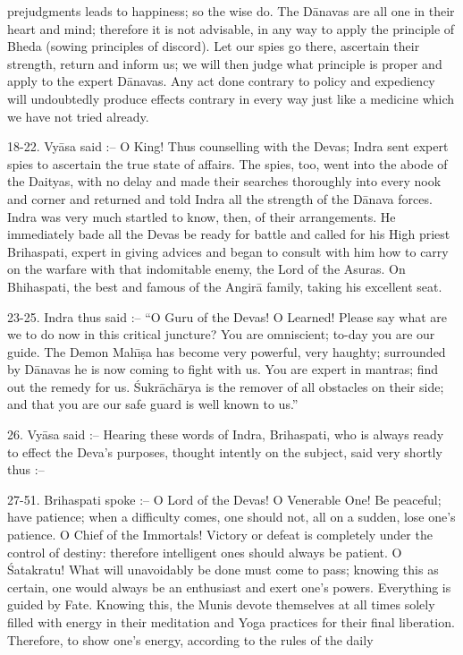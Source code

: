 prejudgments leads to happiness; so the wise do. The D\=anavas are all one in their heart and mind; therefore it is not advisable, in any way to apply the principle of Bheda (sowing principles of discord). Let our spies go there, ascertain their strength, return and inform us; we will then judge what principle is proper and apply to the expert D\=anavas. Any act done contrary to policy and expediency will undoubtedly produce effects contrary in every way just like a medicine which we have not tried already.

18-22. Vy\=asa said :-- O King! Thus counselling with the Devas; Indra sent expert spies to ascertain the true state of affairs. The spies, too, went into the abode of the Daityas, with no delay and made their searches thoroughly into every nook and corner and returned and told Indra all the strength of the D\=anava forces. Indra was very much startled to know, then, of their arrangements. He immediately bade all the Devas be ready for battle and called for his High priest Brihaspati, expert in giving advices and began to consult with him how to carry on the warfare with that indomitable enemy, the Lord of the Asuras. On Bhihaspati, the best and famous of the Angir\=a family, taking his excellent seat.

23-25. Indra thus said :-- ``O Guru of the Devas! O Learned! Please say what are we to do now in this critical juncture? You are omniscient; to-day you are our guide. The Demon Mah\={\i}\d{s}a has become very powerful, very haughty; surrounded by D\=anavas he is now coming to fight with us. You are expert in mantras; find out the remedy for us. \'Sukr\=ach\=arya is the remover of all obstacles on their side; and that you are our safe guard is well known to us.''

26. Vy\=asa said :-- Hearing these words of Indra, Brihaspati, who is always ready to effect the Deva's purposes, thought intently on the subject, said very shortly thus :--

27-51. Brihaspati spoke :-- O Lord of the Devas! O Venerable One! Be peaceful; have patience; when a difficulty comes, one should not, all on a sudden, lose one's patience. O Chief of the Immortals! Victory or defeat is completely under the control of destiny: therefore intelligent ones should always be patient. O \'Satakratu! What will unavoidably be done must come to pass; knowing this as certain, one would always be an enthusiast and exert one's powers. Everything is guided by Fate. Knowing this, the Munis devote themselves at all times solely filled with energy in their meditation and Yoga practices for their final liberation. Therefore, to show one's energy, according to the rules of the daily

